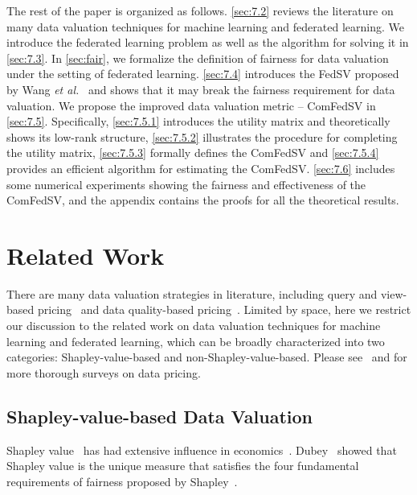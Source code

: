 The rest of the paper is organized as follows. \autoref{sec:7.2} reviews the literature on many data valuation techniques for machine learning and federated learning. We introduce the federated learning problem as well as the algorithm for solving it in \autoref{sec:7.3}. In \autoref{sec:fair}, we formalize the definition of fairness for data valuation under the setting of federated learning. \autoref{sec:7.4} introduces the FedSV proposed by Wang \textit{et al.}~\cite{wang2020principled} and shows that it may break the fairness requirement for data valuation. We propose the improved data valuation metric -- ComFedSV in \autoref{sec:7.5}. Specifically, \autoref{sec:7.5.1} introduces the utility matrix and theoretically shows its low-rank structure, \autoref{sec:7.5.2} illustrates the procedure for completing the utility matrix, \autoref{sec:7.5.3} formally defines the ComFedSV and \autoref{sec:7.5.4} provides an efficient algorithm for estimating the ComFedSV. \autoref{sec:7.6} includes some numerical experiments showing the fairness and effectiveness of the ComFedSV, and the appendix contains the proofs for all the theoretical results. 

\section{Related Work} \label{sec:7.2}
There are many data valuation strategies in literature, including query and view-based pricing~\cite{koutris2015query, koutris2012querymarket, koutris2013toward} and data quality-based pricing~\cite{heckman2015pricing, pipino2002data}. Limited by space, here we restrict our discussion to the related work on data valuation techniques for machine learning and federated learning, which can be broadly characterized into two categories: Shapley-value-based and non-Shapley-value-based. Please see~\cite{pei2020survey} and \cite{cong2021data} for more thorough surveys on data pricing. 

\subsection{Shapley-value-based Data Valuation}
Shapley value~\cite{shapley201617} has had extensive influence in economics~\cite{gul1989bargaining}. Dubey~\cite{dubey1975uniqueness} showed that Shapley value is the unique measure that satisfies the four fundamental requirements of fairness proposed by Shapley~\cite{shapley201617}. 

